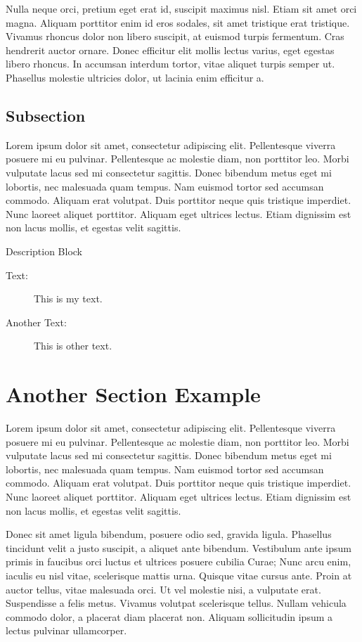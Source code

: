 \documentclass{arcanum}
\begin{document}
Nulla neque orci, pretium eget erat id, suscipit maximus nisl. Etiam sit amet
orci magna. Aliquam porttitor enim id eros sodales, sit amet tristique erat
tristique. Vivamus rhoncus dolor non libero suscipit, at euismod turpis fermentum.
Cras hendrerit auctor ornare. Donec efficitur elit mollis lectus varius, eget
egestas libero rhoncus. In accumsan interdum tortor, vitae aliquet turpis semper
ut. Phasellus molestie ultricies dolor, ut lacinia enim efficitur a.

\subsection{Subsection}
Lorem ipsum dolor sit amet, consectetur adipiscing elit. Pellentesque viverra
posuere mi eu pulvinar. Pellentesque ac molestie diam, non porttitor leo. Morbi
vulputate lacus sed mi consectetur sagittis. Donec bibendum metus eget mi lobortis,
nec malesuada quam tempus. Nam euismod tortor sed accumsan commodo. Aliquam erat
volutpat. Duis porttitor neque quis tristique imperdiet. Nunc laoreet aliquet
porttitor. Aliquam eget ultrices lectus. Etiam dignissim est non lacus mollis,
et egestas velit sagittis.

\begin{descriptionblock}{Description Block}
  \begin{description}
    \item[Text:] This is my text.
    \item[Another Text:] This is other text.
  \end{description}
\end{descriptionblock}

\section{Another Section Example}
Lorem ipsum dolor sit amet, consectetur adipiscing elit. Pellentesque viverra
posuere mi eu pulvinar. Pellentesque ac molestie diam, non porttitor leo. Morbi
vulputate lacus sed mi consectetur sagittis. Donec bibendum metus eget mi lobortis,
nec malesuada quam tempus. Nam euismod tortor sed accumsan commodo. Aliquam erat
volutpat. Duis porttitor neque quis tristique imperdiet. Nunc laoreet aliquet
porttitor. Aliquam eget ultrices lectus. Etiam dignissim est non lacus mollis,
et egestas velit sagittis.

Donec sit amet ligula bibendum, posuere odio sed, gravida ligula. Phasellus tincidunt
velit a justo suscipit, a aliquet ante bibendum. Vestibulum ante ipsum primis in
faucibus orci luctus et ultrices posuere cubilia Curae; Nunc arcu enim, iaculis
eu nisl vitae, scelerisque mattis urna. Quisque vitae cursus ante. Proin at auctor
tellus, vitae malesuada orci. Ut vel molestie nisi, a vulputate erat. Suspendisse a
felis metus. Vivamus volutpat scelerisque tellus. Nullam vehicula commodo dolor,
a placerat diam placerat non. Aliquam sollicitudin ipsum a lectus pulvinar ullamcorper.
\end{document}
